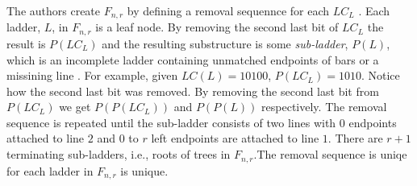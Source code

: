 The authors create $F_{n,r}$ by defining a removal sequennce for 
each $LC_{L}$ \cite{A6}. Each ladder, $L$, in 
$F_{n,r}$ is a leaf node. By removing the second last bit of $LC_{L}$ the result 
is $P(LC_{L})$ and the resulting substructure is some \emph{sub-ladder}, $P(L)$, which 
is an incomplete ladder containing unmatched endpoints of bars or a missining line \cite{A6}. For example, 
given $LC(L)=10100$, $P(LC_{L})=1010$. Notice how the second last bit was removed. 
By removing the second last bit from $P(LC_{L})$ we get $P(P(LC_{L}))$ and $P(P(L))$ respectively.
The removal sequence is repeated until the sub-ladder consists of two lines with $0$ endpoints
attached to line $2$ and $0$ to $r$ left endpoints are attached to line $1$. There are $r+1$
terminating sub-ladders, i.e., roots of trees in $F_{n, r}$.The removal sequence is uniqe for each ladder in $F_{n,r}$ is unique.\par
